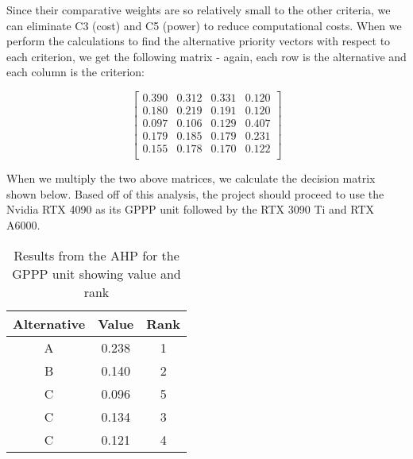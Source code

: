 \begin{fullwidth}
        Since their comparative weights are so relatively small to the other criteria, we can eliminate C3 (cost) and C5 (power) to reduce computational costs. When we perform the calculations to find the alternative priority vectors with respect to each criterion, we get the following matrix - again, each row is the alternative and each column is the criterion:

        \[ 
        \left[ {\begin{array}{cccccc}
        0.390 & 0.312 & 0.331 & 0.120 \\
        0.180 & 0.219 & 0.191 & 0.120 \\
        0.097 & 0.106 & 0.129 & 0.407 \\
        0.179 & 0.185 & 0.179 & 0.231 \\
        0.155 & 0.178 & 0.170 & 0.122 \\
        \end{array} } \right]
        \]

        When we multiply the two above matrices, we calculate the decision matrix shown below. Based off of this analysis, the project should proceed to use the Nvidia RTX 4090 as its GPPP unit followed by the RTX 3090 Ti and RTX A6000.

        \begin{table}[]
            \centering
            \begin{tabular}{|c|c|c|}
                \hline
                \textbf{Alternative} & \textbf{Value} & \textbf{Rank} \\
                \hline
                A & 0.238 & 1 \\ \hline
                B & 0.140 & 2 \\ \hline
                C & 0.096 & 5 \\ \hline
                C & 0.134 & 3 \\ \hline
                C & 0.121 & 4 \\ \hline
            \end{tabular}
            \caption{Results from the AHP for the GPPP unit showing value and rank}
            \label{tab:gppp_ahp_results}
        \end{table}        
\end{fullwidth}